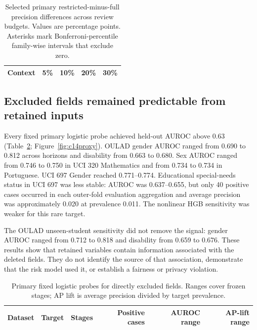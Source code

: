 \documentclass[11pt]{article}
\begin{document}
\begin{table}[tbp]
\centering
\caption{Selected primary restricted-minus-full precision differences across review budgets. Values are percentage points. Asterisks mark Bonferroni-percentile family-wise intervals that exclude zero.}
\label{tab:c14budget}
\scriptsize
\setlength{\tabcolsep}{4pt}
\begin{tabular}{lrrrr}
\toprule
Context & 5\% & 10\% & 20\% & 30\% \\
\midrule

\end{tabular}
\end{table}

\subsection{Excluded fields remained predictable from retained inputs}

Every fixed primary logistic probe achieved held-out AUROC above 0.63 (Table~\ref{tab:c14proxy}; Figure~\ref{fig:c14proxy}). OULAD gender AUROC ranged from 0.690 to 0.812 across horizons and disability from 0.663 to 0.680. Sex AUROC ranged from 0.746 to 0.750 in UCI 320 Mathematics and from 0.734 to 0.734 in Portuguese. UCI 697 Gender reached 0.771--0.774. Educational special-needs status in UCI 697 was less stable: AUROC was 0.637--0.655, but only 40 positive cases occurred in each outer-fold evaluation aggregation and average precision was approximately 0.020 at prevalence 0.011. The nonlinear HGB sensitivity was weaker for this rare target.

The OULAD unseen-student sensitivity did not remove the signal: gender AUROC ranged from 0.712 to 0.818 and disability from 0.659 to 0.676. These results show that retained variables contain information associated with the deleted fields. They do not identify the source of that association, demonstrate that the risk model used it, or establish a fairness or privacy violation.

\begin{table}[tbp]
\centering
\caption{Primary fixed logistic probes for directly excluded fields. Ranges cover frozen stages; AP lift is average precision divided by target prevalence.}
\label{tab:c14proxy}
\scriptsize
\begin{tabular}{llrrrr}
\toprule
Dataset & Target & Stages & Positive cases & AUROC range & AP-lift range \\
\midrule

\end{tabular}
\end{table}
\end{document}
